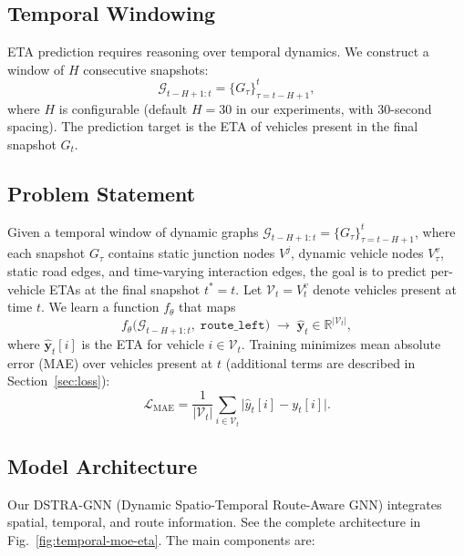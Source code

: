 \subsection{Temporal Windowing}
ETA prediction requires reasoning over temporal dynamics. We construct a window of $H$ consecutive snapshots:
\begin{equation}
\mathcal{G}_{t-H+1:t} = \{G_\tau\}_{\tau=t-H+1}^t,
\end{equation}
where $H$ is configurable (default $H{=}30$ in our experiments, with 30-second spacing). The prediction target is the ETA of vehicles present in the final snapshot $G_t$.

\subsection{Problem Statement}
Given a temporal window of dynamic graphs $\mathcal{G}_{t-H+1:t}=\{G_{\tau}\}_{\tau=t-H+1}^{t}$, where each snapshot $G_{\tau}$ contains static junction nodes $V^{j}$, dynamic vehicle nodes $V^{v}_{\tau}$, static road edges, and time-varying interaction edges, the goal is to predict per-vehicle ETAs at the final snapshot $t^*{=}t$. Let $\mathcal{V}_t = V^{v}_{t}$ denote vehicles present at time $t$. We learn a function $f_{\theta}$ that maps
\begin{equation}
f_{\theta}\big(\mathcal{G}_{t-H+1:t},\;\texttt{route\_left}\big) \;\to\; \hat{\mathbf{y}}_t \in \mathbb{R}^{|\mathcal{V}_t|},
\end{equation}
where $\hat{\mathbf{y}}_t[i]$ is the ETA for vehicle $i\in\mathcal{V}_t$. Training minimizes mean absolute error (MAE) over vehicles present at $t$ (additional terms are described in Section~\ref{sec:loss}):
\begin{equation}
\mathcal{L}_{\text{MAE}} = \frac{1}{|\mathcal{V}_t|}\sum_{i\in\mathcal{V}_t} \big| \hat{y}_t[i] - y_t[i] \big|.
\end{equation}

\subsection{Model Architecture}
Our DSTRA-GNN (Dynamic Spatio-Temporal Route-Aware GNN) integrates spatial, temporal, and route information. See the complete architecture in Fig.~\ref{fig:temporal-moe-eta}. The main components are:

